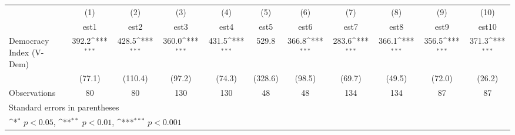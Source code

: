 {
\def\sym#1{\ifmmode^{#1}\else\(^{#1}\)\fi}
\begin{tabular}{l*{10}{c}}
\hline\hline
                    &\multicolumn{1}{c}{(1)}         &\multicolumn{1}{c}{(2)}         &\multicolumn{1}{c}{(3)}         &\multicolumn{1}{c}{(4)}         &\multicolumn{1}{c}{(5)}         &\multicolumn{1}{c}{(6)}         &\multicolumn{1}{c}{(7)}         &\multicolumn{1}{c}{(8)}         &\multicolumn{1}{c}{(9)}         &\multicolumn{1}{c}{(10)}         \\
                    &        est1         &        est2         &        est3         &        est4         &        est5         &        est6         &        est7         &        est8         &        est9         &       est10         \\
\hline
Democracy Index (V-Dem)&       392.2\sym{***}&       428.5\sym{***}&       360.0\sym{***}&       431.5\sym{***}&       529.8         &       366.8\sym{***}&       283.6\sym{***}&       366.1\sym{***}&       356.5\sym{***}&       371.3\sym{***}\\
                    &      (77.1)         &     (110.4)         &      (97.2)         &      (74.3)         &     (328.6)         &      (98.5)         &      (69.7)         &      (49.5)         &      (72.0)         &      (26.2)         \\
\hline
Observations        &          80         &          80         &         130         &         130         &          48         &          48         &         134         &         134         &          87         &          87         \\
\hline\hline
\multicolumn{11}{l}{\footnotesize Standard errors in parentheses}\\
\multicolumn{11}{l}{\footnotesize \sym{*} \(p<0.05\), \sym{**} \(p<0.01\), \sym{***} \(p<0.001\)}\\
\end{tabular}
}
